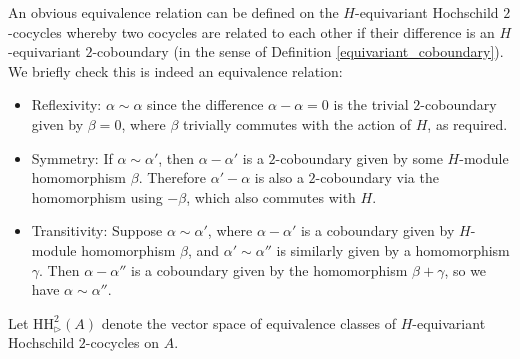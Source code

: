 \documentclass[10pt]{article}
\newcommand{\nt}{\noindent}
\newcommand{\HH}{\text{HH}}
\theoremstyle{definition}
\begin{document}
\nt An obvious equivalence relation can be defined on the $H$-equivariant Hochschild $2$-cocycles whereby two cocycles are related to each other if their difference is an $H$-equivariant $2$-coboundary (in the sense of Definition \ref{equivariant_coboundary}). We briefly check this is indeed an equivalence relation:
\begin{itemize}
  \item Reflexivity: $\alpha\sim \alpha$ since the difference $\alpha-\alpha=0$ is the trivial $2$-coboundary given by $\beta=0$, where $\beta$ trivially commutes with the action of $H$, as required.
  \item Symmetry: If $\alpha\sim \alpha'$, then $\alpha-\alpha'$ is a $2$-coboundary given by some $H$-module homomorphism $\beta$. Therefore $\alpha'-\alpha$ is also a $2$-coboundary via the homomorphism  using $-\beta$, which also commutes with $H$.
  \item Transitivity: Suppose $\alpha\sim \alpha'$, where $\alpha-\alpha'$ is a coboundary given by $H$-module homomorphism $\beta$, and $\alpha'\sim \alpha''$ is similarly given by a homomorphism $\gamma$. Then $\alpha-\alpha''$ is a coboundary given by the homomorphism $\beta+\gamma$, so we have $\alpha\sim \alpha''$.
\end{itemize}
Let $\HH^2_\rhd (A)$ denote the vector space of equivalence classes of $H$-equivariant Hochschild $2$-cocycles on $A$.
\end{document}
